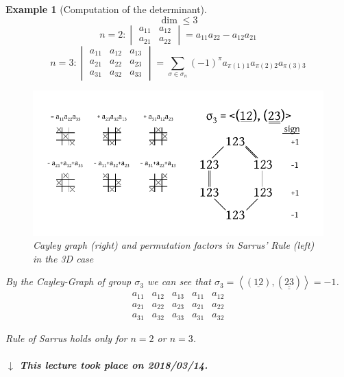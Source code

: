 \documentclass[a4paper]{article}
\newcounter{lecref}[section]
\numberwithin{lecref}{section}
\newtheorem{example}[lecref]{Example}
\newcommand{\angel}[1]{\left\langle#1\right\rangle}
\newcommand{\dateref}[1]{%
  \begin{mdframed}[backgroundcolor=gray!10,innerbottommargin=0pt,innertopmargin=0pt]
    \paragraph{\textit{$\downarrow$ This lecture took place on #1.}}%
  \end{mdframed}%
}
\begin{document}
\begin{example}[Computation of the determinant] %
  \[ \dim \leq 3 \]
  \[
    n = 2:
    \begin{vmatrix} a_{11} & a_{12} \\ a_{21} & a_{22} \end{vmatrix} = a_{11} a_{22} - a_{12} a_{21}
  \] \[
    n = 3:
    \begin{vmatrix} a_{11} & a_{12} & a_{13} \\ a_{21} & a_{22} & a_23 \\ a_{31} & a_{32} & a_{33} \end{vmatrix}
    = \sum_{\sigma \in \sigma_n} (-1)^\pi a_{\pi(1)1} a_{\pi(2)2} a_{\pi(3)3}
  \]
  
  \begin{figure}[!h]
    \begin{center}
      \includegraphics{img/02a_cayley_graph.pdf}
      \caption{Cayley graph (right) and permutation factors in Sarrus' Rule (left) in the 3D case}
      \label{img:cayley}
    \end{center}
  \end{figure}

  By the Cayley-Graph of group $\sigma_3$ we can see that $\sigma_3 = \angel{(\underline{12}), (\underline{\underline{23}})} = -1$.
  \[
    \begin{array}{ccc|cc}
      a_{11} & a_{12} & a_{13} & a_{11} & a_{12} \\
      a_{21} & a_{22} & a_{23} & a_{21} & a_{22} \\
      a_{31} & a_{32} & a_{33} & a_{31} & a_{32}
    \end{array}
  \]

  \emph{Rule of Sarrus} holds only for $n=2$ or $n=3$.
\end{example}

\dateref{2018/03/14}
\end{document}
